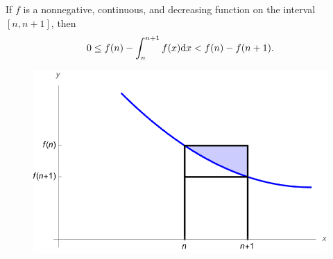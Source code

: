 

\begin{lemma}
If $f$ is a nonnegative, continuous, and decreasing function on the interval $[n, n+1]$, then
\begin{equation*}
0\le f(n) - \int_n^{n+1}f(x)\mathrm{d} x < f(n) - f(n+1).
\end{equation*}
\end{lemma}

\begin{figure}[h]
\includegraphics[width=5in]{img/series_integral_diff}
\end{figure}

\newpage

